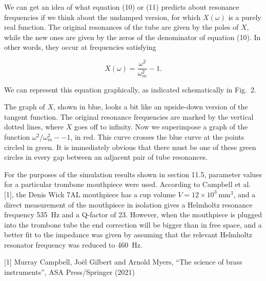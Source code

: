   We can get an idea of what equation (10) or (11) predicts about resonance 
  frequencies if we think about the undamped version, for which $X(\omega)$ is 
  a purely real function. The original resonances of the tube are given by the 
  poles of $X$, while the new ones are given by the zeros of the denominator of 
  equation (10). In other words, they occur at frequencies satisfying 

  \begin{equation*}X(\omega)=\dfrac{\omega^2}{\omega_m^2}-1. 
  \tag{12}\end{equation*} 

  We can represent this equation graphically, as indicated schematically in 
  Fig.\ 2. 


  The graph of $X$, shown in blue, looks a bit like an upside-down version of 
  the tangent function. The original resonance frequencies are marked by the 
  vertical dotted lines, where $X$ goes off to infinity. Now we superimpose a 
  graph of the function $\omega^2/\omega_m^2 -- 1$, in red. This curve crosses 
  the blue curve at the points circled in green. It is immediately obvious that 
  there must be one of these green circles in every gap between an adjacent 
  pair of tube resonances. 

  For the purposes of the simulation results shown in section 11.5, parameter 
  values for a particular trombone mouthpiece were used. According to Campbell 
  et al. [1], the Denis Wick 7AL mouthpiece has a cup volume $V=12 \times 
  10^3\mathrm{~mm^3}$, and a direct measurement of the mouthpiece in isolation 
  gives a Helmholtz resonance frequency 535~Hz and a Q-factor of 23. However, 
  when the mouthpiece is plugged into the trombone tube the end correction will 
  be bigger than in free space, and a better fit to the impedance was given by 
  assuming that the relevant Helmholtz resonator frequency was reduced to 
  460~Hz. 

  \sectionreferences{}[1] Murray Campbell, Joël Gilbert and Arnold Myers, “The 
  science of brass instruments”, ASA Press/Springer (2021) 